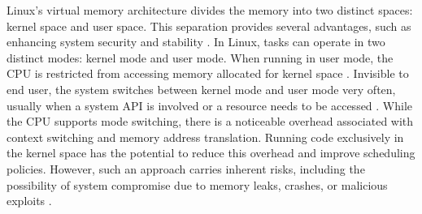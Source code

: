 Linux's virtual memory architecture divides the memory into two distinct spaces: kernel space and user space. This separation provides several advantages, such as enhancing system security and stability \cite{understanding_the_linux_kernel_bovet_cassetti}.
In Linux, tasks can operate in two distinct modes: kernel mode and user mode. When running in user mode, the CPU is restricted from accessing memory allocated for kernel space \cite{kerrisk_linux_2010}.
Invisible to end user, the system switches between kernel mode and user mode very often, usually when a system \ac{API} is involved or a resource needs to be accessed \cite{Robert_linux_kernel_dev}.
While the CPU supports mode switching, there is a noticeable overhead associated with context switching and memory address translation. 
Running code exclusively in the kernel space has the potential to reduce this overhead and improve scheduling policies. 
However, such an approach carries inherent risks, including the possibility of system compromise due to memory leaks, crashes, or malicious exploits \cite{lwn_detect_kernel_mem_leak} \cite{emamdoost_detecting_2021}.

